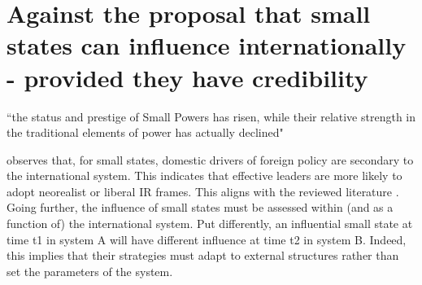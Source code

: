 \chapter{Against the proposal that small states can influence internationally - provided they have credibility}
``the status and prestige of Small Powers has
risen, while their relative strength in the traditional elements of power has
actually declined" \parencite{ROTHSTEIN_1966}


\textcite{HANDEL_2005} observes that, for small states, domestic drivers of foreign policy are secondary to the international system. This indicates that effective leaders are more likely to adopt neorealist or liberal IR frames. This aligns with the reviewed literature \parencite{BAILES_2013,WALTZ_1969,BAILES_2012,BECKLEY_2018,THORHALLSSON_2006,TONRA_1999}. Going further, the influence of small states must be assessed within (and as a function of) the international system. Put differently, an influential small state at time t1 in system A will have different influence at time t2 in system B. Indeed, this implies that their strategies must adapt to external structures rather than set the parameters of the system.
